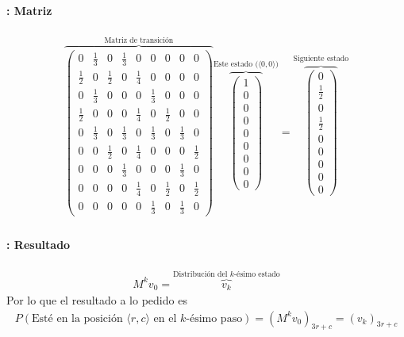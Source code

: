 \documentclass{beamer}
\begin{document}
\begin{frame}
  \frametitle{\SECTIONC}
  \framesubtitle{\EJC: Matriz}

  \begin{gather*}
    \overbrace{\begin{pmatrix}
        0 & \frac{1}{3} & 0 & \frac{1}{3} & 0 & 0 & 0 & 0 & 0  \\
        \frac{1}{2} & 0 & \frac{1}{2} & 0 & \frac{1}{4} & 0 & 0 & 0 & 0  \\
        0 & \frac{1}{3} & 0 & 0 & 0 & \frac{1}{3} & 0 & 0 & 0  \\
        \frac{1}{2} & 0 & 0 & 0 & \frac{1}{4} & 0 & \frac{1}{2} & 0 & 0  \\
        0 & \frac{1}{3} & 0 & \frac{1}{3} & 0 & \frac{1}{3} & 0 & \frac{1}{3} & 0  \\
        0 & 0 & \frac{1}{2} & 0 & \frac{1}{4} & 0 & 0 & 0 & \frac{1}{2} \\
        0 & 0 & 0 & \frac{1}{3} & 0 & 0 & 0 & \frac{1}{3} & 0  \\
        0 & 0 & 0 & 0 & \frac{1}{4} & 0 & \frac{1}{2} & 0 & \frac{1}{2} \\
        0 & 0 & 0 & 0 & 0 & \frac{1}{3} & 0 & \frac{1}{3} & 0
    \end{pmatrix}}^{\text{Matriz de transición}}
    \overbrace{\begin{pmatrix}
      1 \\ 0 \\ 0 \\ 0 \\ 0 \\ 0 \\ 0 \\ 0 \\ 0 
    \end{pmatrix}}^{\text{Este estado (\(\langle 0, 0 \rangle\))}}
    =
    \overbrace{\begin{pmatrix}
      0 \\ \frac{1}{2} \\ 0 \\ \frac{1}{2} \\ 0 \\ 0 \\ 0 \\ 0 \\ 0 
    \end{pmatrix}}^{\text{Siguiente estado}}
  \end{gather*}
\end{frame}

\begin{frame}
  \frametitle{\SECTIONC}
  \framesubtitle{\EJC: Resultado}

  \begin{gather*}
    M^{k} v_{0} = \overbrace{v_{k}}^{\text{Distribución del \(k\)-ésimo estado}}
  \end{gather*} \pause
  Por lo que el resultado a lo pedido es
  \begin{gather*}
    P(\text{Esté en la posición } \langle r, c \rangle \text{ en el \(k\)-ésimo paso}) = (M^{k}v_{0})_{3r + c} = (v_{k})_{3r + c}
  \end{gather*}
\end{frame}
\end{document}
